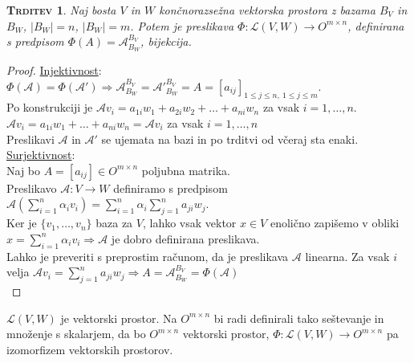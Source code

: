 \documentclass[a4paper,12pt]{article}
\newtheorem*{trditev}{\textsc{Trditev}}
\begin{document}
\begin{trditev}
	Naj bosta $V$ in $W$ končnorazsežna vektorska prostora z bazama $B_V$ in $B_W$, $|B_W|=n$, $|B_W|=m$. Potem je preslikava $\Phi: \mathcal{L}(V,W)\to O^{m\times n}$, definirana s \linebreak predpisom $\Phi(A)=\mathcal{A}^{B_V}_{B_W}$, bijekcija. \\
\end{trditev}
\begin{proof}
	\underline{Injektivnost}:\\

	$\Phi(\mathcal{A})=\Phi(\mathcal{A}')\Rightarrow\mathcal{A}^{B_V}_{B_W}=\mathcal{A}'^{B_V}_{B_W}=A=[a_{ij}]_{1\leq j \leq n,~1\leq j \leq m}$. \\

	Po konstrukciji je $\mathcal{A}v_i=a_{1i}w_1+a_{2i}w_2+\ldots+a_{ni}w_n$ za vsak $i=1,\ldots,n$.\\

	$\mathcal{A}v_i=a_{1i}w_1+\ldots+a_{ni}w_n=\mathcal{A}v_i$ za vsak $i=1,\ldots,n$\\

	Preslikavi $\mathcal{A}$ in $\mathcal{A}'$ se ujemata na bazi in po trditvi od včeraj sta enaki. \\

	\underline{Surjektivnost}:\\

	Naj bo $A=[a_{ij}]\in O^{m\times n}$ poljubna matrika. \\

	Preslikavo $\mathcal{A}:V\to W$ definiramo s predpisom $\mathcal{A}(\sum_{i=1}^n \alpha_i v_i)=\sum_{i=1}^n \alpha_i \sum_{j=1}^n a_{ji}w_j$.\\

	Ker je $\{v_1,\ldots,v_n\}$ baza za $V$, lahko vsak vektor $x\in V$ enolično zapišemo v obliki \linebreak  $x=\sum_{i=1}^n \alpha_i v_i \Rightarrow \mathcal{A}$ je dobro definirana preslikava. \\
	
	Lahko je preveriti s preprostim računom, da je preslikava $\mathcal{A}$ linearna. Za vsak $i$ velja $\mathcal{A}v_i=\sum_{j=1}^n a_{ji}w_j \Rightarrow A=\mathcal{A}^{B_V}_{B_W}=\Phi(\mathcal{A})$\\
\end{proof}

$\mathcal{L}(V,W)$ je vektorski prostor.
Na $O^{m\times n}$ bi radi definirali tako seštevanje in množenje s skalarjem, da bo $O^{m\times n}$ vektorski prostor, $\Phi: \mathcal{L}(V,W)\to O^{m\times n}$ pa izomorfizem vektorskih prostorov.\\
\end{document}

